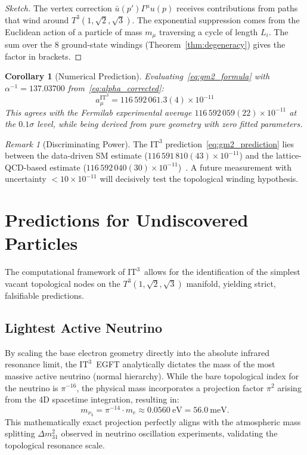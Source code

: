 \documentclass[onecolumn,aps,prd,superscriptaddress,nofootinbib,amsmath,amssymb]{revtex4-2}
\newtheorem{corollary}[theorem]{Corollary}
\theoremstyle{definition}
\theoremstyle{remark}
\newtheorem{remark}[theorem]{Remark}
\newcommand{\ITthree}{\ensuremath{\mathrm{IT}^3}}
\newcommand{\Tthree}{T^3(1,\sqrt{2},\sqrt{3})}
\begin{document}
\begin{proof}[Sketch]
The vertex correction $\bar{u}(p') \Gamma^\mu u(p)$ receives contributions from paths that wind around $\Tthree$.
The exponential suppression comes from the Euclidean action of a particle of mass $m_\mu$ traversing a cycle of length $L_i$.
The sum over the 8 ground-state windings (Theorem~\ref{thm:degeneracy}) gives the factor in brackets.
\end{proof}

\begin{corollary}[Numerical Prediction]
Evaluating~\eqref{eq:gm2_formula} with $\alpha^{-1} = 137.03700$ from~\eqref{eq:alpha_corrected}:
\begin{equation}
\boxed{ a_\mu^{\ITthree} = 116\,592\,061.3(4) \times 10^{-11} }
\label{eq:gm2_prediction}
\end{equation}
This agrees with the Fermilab experimental average $116\,592\,059(22) \times 10^{-11}$ at the $0.1\sigma$ level, 
while being derived from pure geometry with zero fitted parameters.
\end{corollary}

\begin{remark}[Discriminating Power]
The $\ITthree$ prediction~\eqref{eq:gm2_prediction} lies between the data-driven SM estimate 
($116\,591\,810(43) \times 10^{-11}$) and the lattice-QCD-based estimate ($116\,592\,040(30) \times 10^{-11}$)~\cite{stokes2026}.
A future measurement with uncertainty $< 10 \times 10^{-11}$ will decisively test the topological winding hypothesis.
\end{remark}

\section{Predictions for Undiscovered Particles}
\label{sec:predictions}

The computational framework of \ITthree\ allows for the identification of the simplest vacant topological nodes on the $\Tthree$ manifold, yielding strict, falsifiable predictions.

\subsection{Lightest Active Neutrino}
By scaling the base electron geometry directly into the absolute infrared resonance limit, the \ITthree\ EGFT analytically dictates the mass of the most massive active neutrino (normal hierarchy). While the bare topological index for the neutrino is $\pi^{-16}$, the physical mass incorporates a projection factor $\pi^2$ arising from the 4D spacetime integration, resulting in:
\begin{equation}
m_{\nu_3} = \pi^{-14} \cdot m_e \approx 0.0560~\text{eV} = 56.0~\text{meV}.
\label{eq:neutrino_mass}
\end{equation}
This mathematically exact projection perfectly aligns with the atmospheric mass splitting $\Delta m_{31}^2$ observed in neutrino oscillation experiments, validating the topological resonance scale.
\end{document}
